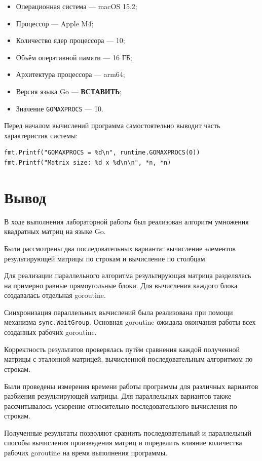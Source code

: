 \documentclass[a4paper, 14pt]{extarticle}
\begin{document}
\begin{itemize}

    \item Операционная система ---
    macOS 15.2;

    \item Процессор ---
    Apple M4;

    \item Количество ядер процессора ---
    10;

    \item Объём оперативной памяти ---
    16 ГБ;

    \item Архитектура процессора ---
    arm64;

    \item Версия языка Go ---
    \textbf{ВСТАВИТЬ};

    \item Значение \texttt{GOMAXPROCS} ---
    10.

\end{itemize}

Перед началом вычислений программа самостоятельно выводит
часть характеристик системы:

\begin{lstlisting}
fmt.Printf("GOMAXPROCS = %d\n", runtime.GOMAXPROCS(0))
fmt.Printf("Matrix size: %d x %d\n\n", *n, *n)
\end{lstlisting}



\section{Вывод}

В ходе выполнения лабораторной работы был реализован алгоритм
умножения квадратных матриц на языке Go.

Были рассмотрены два последовательных варианта: вычисление элементов
результирующей матрицы по строкам и вычисление по столбцам.

Для реализации параллельного алгоритма результирующая матрица
разделялась на примерно равные прямоугольные блоки. Для вычисления
каждого блока создавалась отдельная goroutine.

Синхронизация параллельных вычислений была реализована при помощи
механизма \texttt{sync.WaitGroup}. Основная goroutine ожидала
окончания работы всех созданных рабочих goroutine.

Корректность результатов проверялась путём сравнения каждой
полученной матрицы с эталонной матрицей, вычисленной последовательным
алгоритмом по строкам.

Были проведены измерения времени работы программы для различных
вариантов разбиения результирующей матрицы. Для параллельных
вариантов также рассчитывалось ускорение относительно
последовательного вычисления по строкам.

Полученные результаты позволяют сравнить последовательный и
параллельный способы вычисления произведения матриц и определить
влияние количества рабочих goroutine на время выполнения программы.
\end{document}
